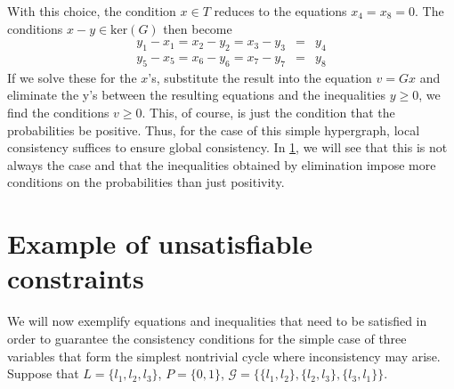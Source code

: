With this choice, the condition $x \in T$ reduces to the equations
$x_4 = x_8 = 0$.  The conditions $x - y \in \mathrm{ker}(G)$ then
become
\begin{eqnarray}
 y_1 - x_1 = x_2 - y_2 = x_3 - y_3 &=& y_4 \\
 y_5 - x_5 = x_6 - y_6 = x_7 - y_7 &=& y_8
\end{eqnarray}
If we solve these for the $x$'s, substitute the result into the
equation $v = Gx$ and eliminate the y's between the resulting
equations and the inequalities $y \ge 0$, we find the conditions $v
\ge 0$.  This, of course, is just the condition that the probabilities
be positive.  Thus, for the case of this simple hypergraph, local
consistency suffices to ensure global consistency.  In \ref{sec:inconsistency},
we will see that this is not always the case and that the
inequalities obtained by elimination impose more conditions on the
probabilities than just positivity.

\section{Example of unsatisfiable constraints}\label{sec:inconsistency}
We will now exemplify equations and inequalities that need to be satisfied in order to guarantee the consistency conditions for the simple case of three variables that form the simplest nontrivial cycle where inconsistency may arise. Suppose that $L = \{l_1,l_2,l_3\}$, $P = \{0,1\}$, $\mathcal{G} = \{\{l_1,l_2\},\{l_2,l_3\},\{l_3,l_1\}\}$.

